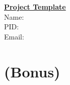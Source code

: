 \documentclass[a4paper]{article}
\renewcommand{\maketitle}{\bgroup\setlength{\parindent}{0pt}
\begin{flushleft}
  {\LARGE \textbf{\underline{Project Template}}}\\
  Name: \\
  PID: \\
  Email:
\end{flushleft}\egroup
}
\begin{document}
\begin{flushleft}
\maketitle
\end{flushleft}

\section{}

\newpage

\section{}

\newpage

\section{}

\newpage

\section{}

\newpage

\section{}

\newpage

\section{}

\newpage

\section{(Bonus)}

\newpage
\end{document}

